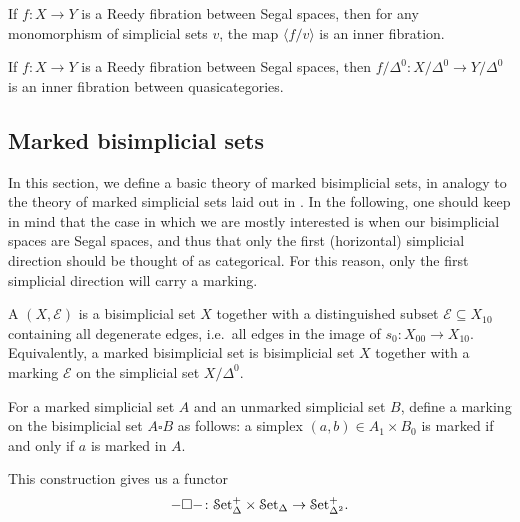 \documentclass[main.tex]{subfiles}
\begin{document}
\begin{theorem}
  \label{thm:inner_fibration_between_quasicategories}
  If $f\colon X \to Y$ is a Reedy fibration between Segal spaces, then for any monomorphism of simplicial sets $v$, the map $\langle f / v \rangle$ is an inner fibration.
\end{theorem}

\begin{corollary}
  \label{cor:reedy_implies_inner}
  If $f\colon X \to Y$ is a Reedy fibration between Segal spaces, then $f / \Delta^{0}\colon X / \Delta^{0} \to Y / \Delta^{0}$ is an inner fibration between quasicategories.
\end{corollary}

\subsection{Marked bisimplicial sets}
\label{ssc:marked_bisimplicial_sets}

In this section, we define a basic theory of marked bisimplicial sets, in analogy to the theory of marked simplicial sets laid out in \cite{highertopostheory}. In the following, one should keep in mind that the case in which we are mostly interested is when our bisimplicial spaces are Segal spaces, and thus that only the first (horizontal) simplicial direction should be thought of as categorical. For this reason, only the first simplicial direction will carry a marking.

\begin{definition}
  A  $(X, \mathcal{E})$ is a bisimplicial set $X$ together with a distinguished subset $\mathcal{E} \subseteq X_{10}$ containing all degenerate edges, i.e.\ all edges in the image of $s_{0}\colon X_{00} \to X_{10}$. Equivalently, a marked bisimplicial set is bisimplicial set $X$ together with a marking $\mathcal{E}$ on the simplicial set $X / \Delta^{0}$.
\end{definition}

\begin{definition}
  For a marked simplicial set $A$ and an unmarked simplicial set $B$, define a marking on the bisimplicial set $A \square B$ as follows: a simplex $(a, b) \in A_{1} \times B_{0}$ is marked if and only if $a$ is marked in $A$.
\end{definition}

This construction gives us a functor
\begin{equation*}
  - \square -  \colon \mathcal{S}\mathrm{et}_{\Delta}^{+} \times \mathcal{S}\mathrm{et}_{\Delta} \to \mathcal{S}\mathrm{et}_{\Delta^{2}}^{+}.
\end{equation*}
\end{document}
